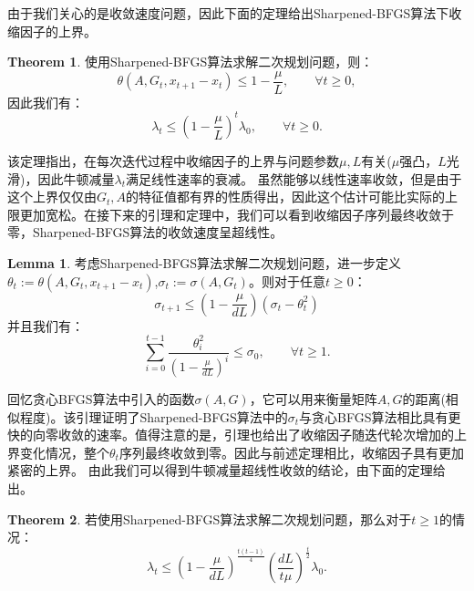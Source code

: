\documentclass[a4paper,twoside,AutoFakeBold]{article}
\theoremstyle{definition}
\newtheorem{thrm2}{{Theorem}}
\newtheorem{lema2}{{Lemma}}
\begin{document}
由于我们关心的是收敛速度问题，因此下面的定理给出Sharpened-BFGS算法下收缩因子的上界。

\begin{thrm2}
    使用Sharpened-BFGS算法求解二次规划问题，则：
    \begin{equation}
        \theta(A, G_t, x_{t + 1} - x_{t})\leq 1 - \frac{\mu}{L}, \qquad \forall t \geq 0,
    \end{equation}
    因此我们有：
    \begin{equation}
        \lambda_t \leq \left(1 - \frac{\mu}{L}\right)^{t}\lambda_0, \qquad \forall t \geq 0.
    \end{equation}
\end{thrm2}

该定理指出，在每次迭代过程中收缩因子的上界与问题参数$\mu,L$有关($\mu$强凸，$L$光滑)，因此牛顿减量$\lambda_t$满足线性速率的衰减。
虽然能够以线性速率收敛，但是由于这个上界仅仅由$G_t,A$的特征值都有界的性质得出，因此这个估计可能比实际的上限更加宽松。在接下来的引理和定理中，我们可以看到收缩因子序列最终收敛于零，Sharpened-BFGS算法的收敛速度呈超线性。

\begin{lema2}
    考虑Sharpened-BFGS算法求解二次规划问题，进一步定义$\theta_t:=\theta(A, G_t, x_{t + 1} - x_{t})$,$\sigma_t := \sigma(A, G_t)$。则对于任意$t\ge 0$：
    \begin{equation}
        \sigma_{t+1} \leq \left(1 - \frac{\mu}{dL}\right)\left(\sigma_t - \theta_t^2\right)
    \end{equation}
    并且我们有：
    \begin{equation}
        \sum_{i = 0}^{t - 1}\frac{\theta^2_i}{(1 - \frac{\mu}{d L})^{i}}  \leq \sigma_0, \qquad \forall t \geq 1. 
    \end{equation}
\end{lema2}

回忆贪心BFGS算法中引入的函数$\sigma (A,G)$，它可以用来衡量矩阵$A,G$的距离(相似程度)。该引理证明了Sharpened-BFGS算法中的$\sigma_t$与贪心BFGS算法相比具有更快的向零收敛的速率。值得注意的是，引理也给出了收缩因子随迭代轮次增加的上界变化情况，整个$\theta_t$序列最终收敛到零。因此与前述定理相比，收缩因子具有更加紧密的上界。
由此我们可以得到牛顿减量超线性收敛的结论，由下面的定理给出。

\begin{thrm2}
    若使用Sharpened-BFGS算法求解二次规划问题，那么对于$t\ge 1$的情况：
    \begin{equation}
        \lambda_t \leq \left(1 - \frac{\mu}{dL}\right)^{\frac{t(t - 1)}{4}} \left(\frac{dL}{t\mu}\right)^{\frac{t}{2}}\lambda_0.
    \end{equation}
\end{thrm2}
\end{document}
